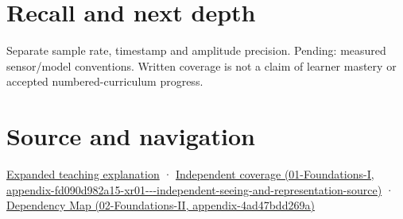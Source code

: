\section{Recall and next depth}\label{appendix-1077ea8fc737-recall-and-next-depth}

Separate sample rate, timestamp and amplitude precision. Pending: measured sensor/model conventions. Written coverage is not a claim of learner mastery or accepted numbered-curriculum progress.

\section{Source and navigation}\label{appendix-1077ea8fc737-source-and-navigation}

\href{Continuous\%20Notes/University\%20-\%20Worlds,\%20Images\%20and\%20Inference\%20-\%20Graphics,\%20Vision\%20and\%20Photography\#Sampling\%20is\%20a\%20question\%20of\%20what\%20remains\%20distinguishable}{Expanded teaching explanation} · \href{../01-Foundations-I/main.pdf\#nameddest=appendix-fd090d982a15-xr01---independent-seeing-and-representation-source}{Independent coverage (01-Foundations-I, appendix-fd090d982a15-xr01-\/-\/-independent-seeing-and-representation-source)} · \href{../02-Foundations-II/main.pdf\#nameddest=appendix-4ad47bdd269a}{Dependency Map (02-Foundations-II, appendix-4ad47bdd269a)}
